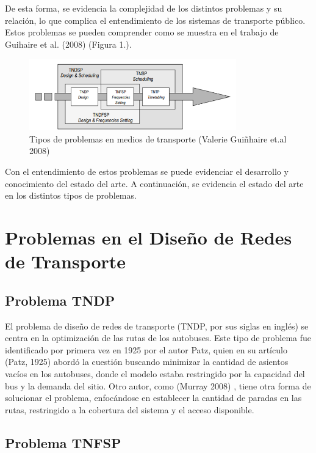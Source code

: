\documentclass[preprint,11pt]{elsarticle}
\begin{document}
De esta forma, se evidencia la complejidad de los distintos problemas y su relación, lo que complica el entendimiento de los sistemas de transporte público. Estos problemas se pueden comprender como se muestra en el trabajo de Guihaire et al. (2008) \cite{guihaire2008} (Figura 1.). 

\captionsetup[figure]{name=Figura}
\begin{figure}[H]
  \centering
  \includegraphics[width=0.8\textwidth]{tipos.png}
  \caption{Tipos de problemas en medios de transporte (Valerie Guiñhaire et.al 2008)}
  \label{fig:mi_imagen}
\end{figure}


Con el entendimiento de estos problemas se puede evidenciar el desarrollo y conocimiento del estado del arte. A continuación, se evidencia el estado del arte en los distintos tipos de problemas.

\section{Problemas en el Diseño de Redes de Transporte}

\subsection{Problema TNDP}

El problema de diseño de redes de transporte (TNDP, por sus siglas en inglés) se centra en la optimización de las rutas de los autobuses. Este tipo de problema fue identificado por primera vez en 1925 por el autor Patz, quien en su artículo (Patz, 1925)  \cite{patz1925} abordó la cuestión buscando minimizar la cantidad de asientos vacíos en los autobuses, donde el modelo estaba restringido por la capacidad del bus y la demanda del sitio. Otro autor, como (Murray 2008) \cite{murray2003}, tiene otra forma de solucionar el problema, enfocándose en establecer la cantidad de paradas en las rutas, restringido a la cobertura del sistema y el acceso disponible.

\subsection{Problema TNFSP}
\end{document}

